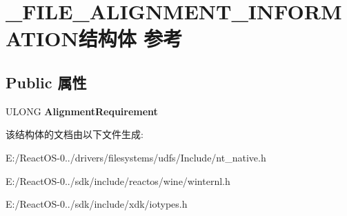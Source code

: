 \hypertarget{struct___f_i_l_e___a_l_i_g_n_m_e_n_t___i_n_f_o_r_m_a_t_i_o_n}{}\section{\+\_\+\+F\+I\+L\+E\+\_\+\+A\+L\+I\+G\+N\+M\+E\+N\+T\+\_\+\+I\+N\+F\+O\+R\+M\+A\+T\+I\+O\+N结构体 参考}
\label{struct___f_i_l_e___a_l_i_g_n_m_e_n_t___i_n_f_o_r_m_a_t_i_o_n}
\subsection*{Public 属性}
\begin{DoxyCompactItemize}
\item 
\mbox{\label{struct___f_i_l_e___a_l_i_g_n_m_e_n_t___i_n_f_o_r_m_a_t_i_o_n_af99dd80e47aedc40a01698fe904224b7}} 
U\+L\+O\+NG {\bfseries Alignment\+Requirement}
\end{DoxyCompactItemize}


该结构体的文档由以下文件生成\+:\begin{DoxyCompactItemize}
\item 
E\+:/\+React\+O\+S-\/0../drivers/filesystems/udfs/\+Include/nt\+\_\+native.\+h\item 
E\+:/\+React\+O\+S-\/0../sdk/include/reactos/wine/winternl.\+h\item 
E\+:/\+React\+O\+S-\/0../sdk/include/xdk/iotypes.\+h\end{DoxyCompactItemize}
